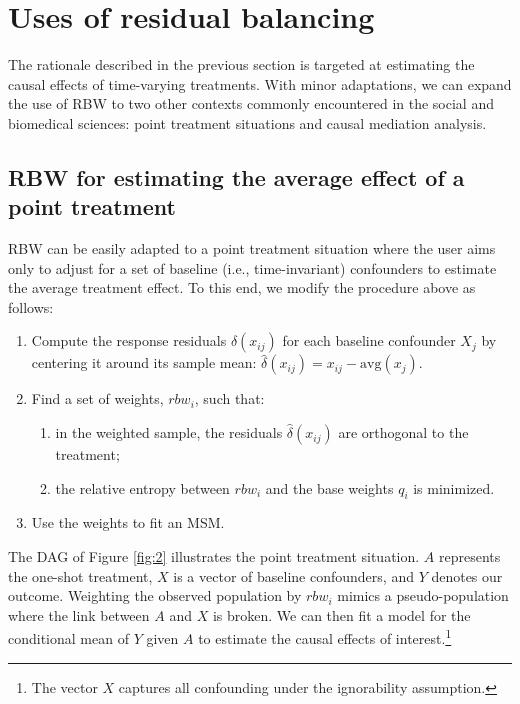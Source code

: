 \hypertarget{uses}{%
\section{Uses of residual balancing}\label{uses}}

The rationale described in the previous section is targeted at
estimating the causal effects of time-varying treatments. With minor
adaptations, we can expand the use of RBW to two other contexts commonly
encountered in the social and biomedical sciences: point treatment
situations and causal mediation analysis.

\hypertarget{rbw-treatment}{%
\subsection{RBW for estimating the average effect of a point
treatment}\label{rbw-treatment}}

RBW can be easily adapted to a point treatment situation where the user
aims only to adjust for a set of baseline (i.e., time-invariant)
confounders to estimate the average treatment effect. To this end, we
modify the procedure above as follows:

\begin{enumerate}
\def\labelenumi{\arabic{enumi}.}
\tightlist
\item
  Compute the response residuals \(\hat{\delta}(x_{ij})\) for each
  baseline confounder \(X_{j}\) by centering it around its sample mean:
  \(\hat{\delta}(x_{ij})=x_{ij}-\text{avg}({x}_{j})\).
\item
  Find a set of weights, \(rbw_{i}\), such that:

  \begin{enumerate}
  \def\labelenumii{\alph{enumii})}
  \tightlist
  \item
    in the weighted sample, the residuals \(\hat{\delta}(x_{ij})\) are
    orthogonal to the treatment;
  \item
    the relative entropy between \(rbw_{i}\) and the base weights
    \(q_{i}\) is minimized.
  \end{enumerate}
\item
  Use the weights to fit an MSM.
\end{enumerate}

The DAG of Figure \ref{fig:2} illustrates the point treatment situation.
\(A\) represents the one-shot treatment, \(X\) is a vector of baseline
confounders, and \(Y\) denotes our outcome. Weighting the observed
population by \(rbw_{i}\) mimics a pseudo-population where the link
between \(A\) and \(X\) is broken. We can then fit a model for the
conditional mean of \(Y\) given \(A\) to estimate the causal effects of
interest.\footnote{The vector \(X\) captures all confounding under the
  ignorability assumption.}

